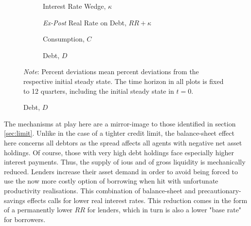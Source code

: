 \documentclass[12pt]{article} %
\numberwithin{equation}{section} %
\numberwithin{figure}{section}
\numberwithin{table}{section}
\begin{document}
\begin{figure}[!ht]
    \centering
    \caption{Baseline Model -- Shock to the Interest Rate Wedge: Aggregate Dynamics}
    \label{fig:baseline-permanent-wedge-agg}
     \begin{subfigure}[b]{0.49\textwidth}
     \caption{Interest Rate Wedge, $\kappa$}
     \label{fig:baseline-permanent-wedge-agg-kappa}
         \centering
         
     \end{subfigure}
     \hfill
     \begin{subfigure}[b]{0.49\textwidth}
     \caption{\textit{Ex-Post} Real Rate on Debt, $RR + \kappa$}
     \label{fig:baseline-permanent-wedge-agg-Rr-on-debt}
         \centering
         
     \end{subfigure}
     \hfill
    \begin{subfigure}[b]{0.49\textwidth}
    \caption{Consumption, $C$}
    \label{fig:baseline-permanent-wedge-agg-C}
         \centering
         
     \end{subfigure}
    \hfill
    \begin{subfigure}[b]{0.49\textwidth}
    \caption{Debt, $D$}
    \label{fig:baseline-permanent-wedge-agg-D}
         \centering
         
     \end{subfigure}

    \vspace{10pt}
     
     \justifying
     \footnotesize
	\textit{Note}: Percent deviations mean percent deviations from the respective initial steady state. The time horizon in all plots is fixed to 12 quarters, including the initial steady state in $t=0$.
\end{figure}

The mechanisms at play here are a mirror-image to those identified in section \ref{sec:limit}. Unlike in the case of a tighter credit limit, the balance-sheet effect here concerns all debtors as the spread affects all agents with negative net asset holdings. Of course, those with very high debt holdings face especially higher interest payments. Thus, the supply of \Gls{iou}s and of gross liquidity is mechanically reduced. Lenders increase their asset demand in order to avoid being forced to use the now more costly option of borrowing when hit with unfortunate productivity realisations. This combination of balance-sheet and precautionary-savings effects calls for lower real interest rates. This reduction comes in the form of a permanently lower $RR$ for lenders, which in turn is also a lower "base rate" for borrowers.
\end{document}
